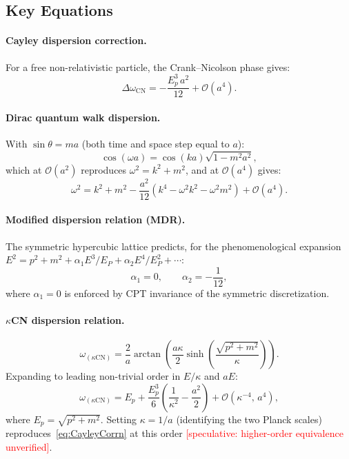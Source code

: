 \documentclass[11pt,a4paper]{article}
\begin{document}
\subsection{Key Equations}

\paragraph{Cayley dispersion correction.}
For a free non-relativistic particle, the Crank--Nicolson phase gives:
\begin{equation}
  \Delta\omega_{\mathrm{CN}} = -\frac{E_p^3\, a^2}{12} + \mathcal{O}(a^4).
  \label{eq:CayleyCorrn}
\end{equation}

\paragraph{Dirac quantum walk dispersion.}
With $\sin\theta = ma$ (both time and space step equal to $a$):
\begin{equation}
  \cos(\omega a) = \cos(ka)\sqrt{1-m^2a^2},
  \label{eq:DQWdisp}
\end{equation}
which at $\mathcal{O}(a^2)$ reproduces $\omega^2=k^2+m^2$, and at $\mathcal{O}(a^4)$ gives:
\begin{equation}
  \omega^2 = k^2 + m^2 - \frac{a^2}{12}\!\left(k^4 - \omega^2 k^2 - \omega^2 m^2\right) + \mathcal{O}(a^4).
  \label{eq:DQWcorrn}
\end{equation}

\paragraph{Modified dispersion relation (MDR).}
The symmetric hypercubic lattice predicts, for the phenomenological expansion $E^2 = p^2 + m^2 + \alpha_1 E^3/E_P + \alpha_2 E^4/E_P^2 + \cdots$:
\begin{equation}
  \alpha_1 = 0, \qquad \alpha_2 = -\frac{1}{12},
  \label{eq:MDRcoeffs}
\end{equation}
where $\alpha_1=0$ is enforced by CPT invariance of the symmetric discretization.

\paragraph{$\kappa$CN dispersion relation.}
\begin{equation}
  \omega_{(\kappa\mathrm{CN})} = \frac{2}{a}\arctan\!\left(\frac{a\kappa}{2}\sinh\!\left(\frac{\sqrt{p^2+m^2}}{\kappa}\right)\right).
  \label{eq:kCNdisp}
\end{equation}
Expanding to leading non-trivial order in $E/\kappa$ and $aE$:
\begin{equation}
  \omega_{(\kappa\mathrm{CN})} = E_p + \frac{E_p^3}{6}\!\left(\frac{1}{\kappa^2} - \frac{a^2}{2}\right) + \mathcal{O}\!\left(\kappa^{-4},\,a^4\right),
  \label{eq:kCNexpand}
\end{equation}
where $E_p = \sqrt{p^2+m^2}$. Setting $\kappa = 1/a$ (identifying the two Planck scales) reproduces~\eqref{eq:CayleyCorrn} at this order \textcolor{red}{[speculative: higher-order equivalence unverified]}.
\end{document}
